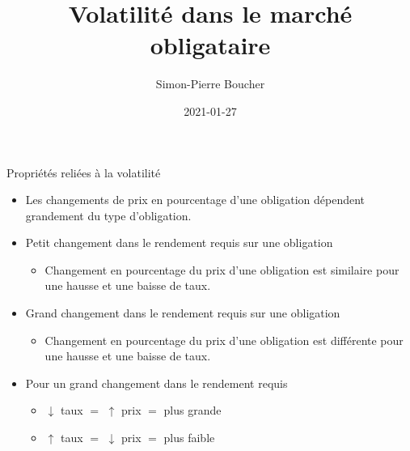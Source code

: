 \documentclass[11pt]{beamer}
\date{2021-01-27}
\author{Simon-Pierre Boucher}
\title{Volatilité dans le marché obligataire}
\institute{Université Laval}
\begin{document}
\begin{frame}
\titlepage
\end{frame}


\begin{frame}{Propriétés reliées à la volatilité}
\begin{itemize}
\item Les changements de prix en pourcentage d'une obligation dépendent grandement du type d'obligation. 
\item Petit changement dans le rendement requis sur une obligation 
\begin{itemize}
\item Changement en pourcentage du prix d'une obligation est similaire pour une hausse et une baisse de taux.
\end{itemize}
\item Grand changement dans le rendement requis sur une obligation 
\begin{itemize}
\item Changement en pourcentage du prix d'une obligation est différente pour une hausse et une baisse de taux.
\end{itemize}
\item Pour un grand changement dans le rendement requis 
\begin{itemize}
\item $\downarrow$ taux $=$ $\uparrow$ prix $=$ plus grande
\item $\uparrow$ taux $=$ $\downarrow$ prix $=$ plus faible
\end{itemize}
\end{itemize}
\end{frame}
\end{document}
